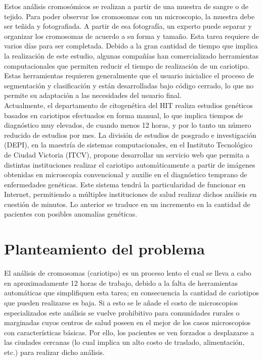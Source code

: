\documentclass[12pt,letterpaper,titlepage]{article}
\begin{document}
Estos análisis cromosómicos se realizan a partir de una muestra de sangre o de tejido. Para poder observar los cromosomas con un microscopio, la muestra debe ser teñida y fotografiada. A partir de esa fotografía, un experto puede separar y organizar los cromosomas de acuerdo a su forma y tamaño. Esta tarea requiere de varios días para ser completada. Debido a la gran cantidad de tiempo que implica la realización de este estudio, algunas compañías han comercializado herramientas computacionales que permiten reducir el tiempo de realización de un cariotipo. Estas herramientas requieren generalmente que el usuario inicialice el proceso de segmentación y clasificación y están desarrolladas bajo código cerrado, lo que no permite su adaptación a las necesidades del usuario final. \\


Actualmente, el departamento de citogenética del HIT realiza estudios genéticos basados en cariotipos efectuados en forma manual, lo que implica tiempos de diagnóstico muy elevados, de cuando menos 12 horas, y por lo tanto un número reducido de estudios por mes. La división de estudios de posgrado e investigación (DEPI), en la maestría de sistemas computacionales, en el Instituto Tecnológico de Ciudad Victoria (ITCV), propone desarrollar un servicio web que permita a distintas instituciones realizar el cariotipo automáticamente a partir de imágenes obtenidas en microscopía convencional y auxilie en el diagnóstico temprano de enfermedades genéticas. Este sistema tendrá la particularidad de funcionar en Internet, permitiendo a múltiples instituciones de salud realizar dichos análisis en cuestión de minutos. Lo anterior se traduce en un incremento en la cantidad de pacientes con posibles anomalías genéticas. \\

\section{Planteamiento del problema}\label{planteamientoproblema}


El análisis de cromosomas (cariotipo) es un proceso lento el cual se lleva a cabo en aproximadamente 12 horas de trabajo, debido a la falta de herramientas automáticas que simplifiquen esta tarea; en consecuencia la cantidad de cariotipos que pueden realizarse es baja. Si a esto se le añade el costo de microscopios especializados este análisis se vuelve prohibitivo para comunidades rurales o marginadas cuyos centros de salud poseen en el mejor de los casos microscopios con características básicas. Por ello, los pacientes se ven forzados a desplazarse a las ciudades cercanas (lo cual implica un alto costo de traslado, alimentación, etc.) para realizar dicho análisis.\\
\end{document}
